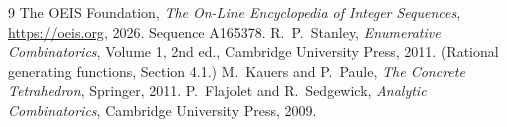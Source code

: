 \documentclass[11pt,a4paper]{article}
\theoremstyle{plain}
\theoremstyle{definition}
\begin{document}
\begin{thebibliography}{9}
 The OEIS Foundation, \emph{The On-Line Encyclopedia of Integer
Sequences}, \url{https://oeis.org}, 2026. Sequence A165378.
 R.~P.~Stanley, \emph{Enumerative Combinatorics}, Volume 1, 2nd ed.,
Cambridge University Press, 2011. (Rational generating functions, Section 4.1.)
 M.~Kauers and P.~Paule, \emph{The Concrete Tetrahedron}, Springer, 2011.
 P.~Flajolet and R.~Sedgewick, \emph{Analytic Combinatorics}, Cambridge
University Press, 2009.
\end{thebibliography}
\end{document}
